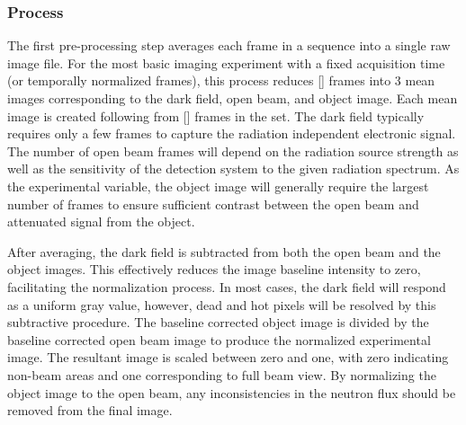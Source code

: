 \documentclass[../../main.tex]{subfiles}
\begin{document}
    \subsubsection{Process}%
    The first pre-processing step averages each frame in a sequence into a single raw image file.
    For the most basic imaging experiment with a fixed acquisition time (or temporally normalized frames), this process reduces [] frames into 3 mean images corresponding to the dark field, open beam, and object image.
    Each mean image  is created following  from [] frames in the set.
    The dark field typically requires only a few frames  to capture the radiation independent electronic signal.
    The number of open beam frames  will depend on the radiation source strength as well as the sensitivity of the detection system to the given radiation spectrum.
    As the experimental variable, the object image will generally require the largest number of frames  to ensure sufficient contrast between the open beam and attenuated signal from the object.
    \par%
    After averaging, the dark field is subtracted from both the open beam and the object images.
    This effectively reduces the image baseline intensity to zero, facilitating the normalization process.
    In most cases, the dark field will respond as a uniform gray value, however, dead and hot pixels will be resolved by this subtractive procedure.
    The baseline corrected object image is divided by the baseline corrected open beam image to produce the normalized experimental image.
    The resultant image is scaled between zero and one, with zero indicating non-beam areas and one corresponding to full beam view.
    By normalizing the object image to the open beam, any inconsistencies in the neutron flux should be removed from the final image.
\end{document}

